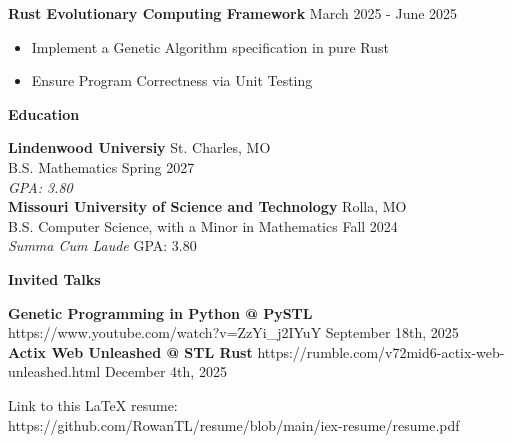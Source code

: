 \documentclass[11pt]{article}
\begin{document}
\textbf{Rust Evolutionary Computing Framework} \hfill March 2025 - June 2025
\begin{itemize}[noitemsep, topsep=0pt, partopsep=0pt, parsep=0pt, itemsep=0pt]
    \item Implement a Genetic Algorithm specification in pure Rust
    \item Ensure Program Correctness via Unit Testing
\end{itemize}

\begin{center}
    \textbf{Education}
\end{center}
\textbf{Lindenwood Universiy} \hfill St. Charles, MO \\
B.S. Mathematics \hfill Spring 2027 \\
\textit{GPA: 3.80}\\

\textbf{Missouri University of Science and Technology} \hfill Rolla, MO \\
B.S. Computer Science, with a Minor in Mathematics \hfill Fall 2024  \\
\textit{Summa Cum Laude} \hfill GPA: 3.80

\begin{center}
    \textbf{Invited Talks}
\end{center}

\textbf{Genetic Programming in Python @ PySTL} \tiny{https://www.youtube.com/watch?v=ZzYi\_j2IYuY} \hfill \normalsize{September 18th, 2025} \\
\textbf{Actix Web Unleashed @ STL Rust} \tiny{https://rumble.com/v72mid6-actix-web-unleashed.html} \hfill \normalsize{December 4th, 2025}

\begin{center}
    \tiny{Link to this LaTeX resume: https://github.com/RowanTL/resume/blob/main/iex-resume/resume.pdf}
\end{center}
\end{document}
